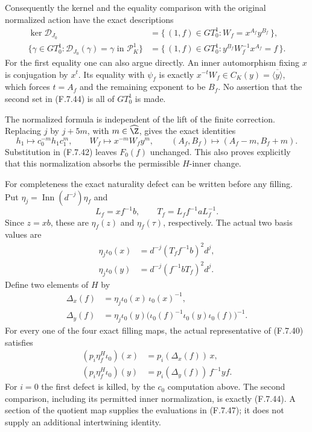 Consequently the kernel and the equality comparison
with the original normalized action have the exact
descriptions
\[
 \begin{split}
 \ker\mathcal D_{J_0}
   &=\{\,(1,f)\in GT_0^1:
                     W_f=x^{A_f}y^{B_f}\,\},\\
 \{\gamma\in GT_0^1:\mathcal D_{J_0}(\gamma)=\gamma
                                      \text{ in }\mathcal P_K^1\}
   &=\{\,(1,f)\in GT_0^1:
                     y^{B_f}W_f^{-1}x^{A_f}=f\,\}.
 \end{split}                                                   \tag{F.7.44}
\]
For the first equality one can also argue directly.
An inner automorphism fixing $x$ is conjugation
by $x^t$.  Its equality with $\psi_f$ is exactly
$x^{-t}W_f\in C_K(y)=\overline{\langle y\rangle}$,
which forces $t=A_f$ and the remaining exponent
to be $B_f$.
No assertion that the second set in (F.7.44)
is all of $GT_0^1$ is made.

The normalized formula is independent of the lift
of the finite correction.  Replacing $j$ by
$j+5m$, with $m\in\widehat\Z$, gives the exact
identities
\[
 h_1\longmapsto c_0^{-m}h_1c_1^m,\qquad
 W_f\longmapsto x^{-m}W_fy^m,\qquad
 (A_f,B_f)\longmapsto(A_f-m,B_f+m).
                                                               \tag{F.7.45}
\]
Substitution in (F.7.42) leaves $F_0(f)$ unchanged.
This also proves explicitly that this normalization
absorbs the permissible $H$-inner change.

For completeness the exact naturality defect can
be written before any filling.  Put
$\eta_j=\operatorname{Inn}(d^{-j})\eta_f$ and
\[
 L_f=x f^{-1}b,\qquad
 T_f=L_f f^{-1}a L_f^{-1}.
\]
Since $z=xb$, these are $\eta_f(z)$ and
$\eta_f(\tau)$, respectively.  The actual two
basis values are
\[
 \begin{split}
 \eta_j\iota_0(x)
     &=d^{-j}(T_f f^{-1}b)^2d^j,\\
 \eta_j\iota_0(y)
     &=d^{-j}(f^{-1}bT_f)^2d^j .
 \end{split}                                                   \tag{F.7.46}
\]
Define two elements of $H$ by
\[
 \begin{split}
 \Delta_x(f)&=\eta_j\iota_0(x)\,\iota_0(x)^{-1},\\
 \Delta_y(f)&=\eta_j\iota_0(y)
              \bigl(\iota_0(f)^{-1}
                       \iota_0(y)\iota_0(f)\bigr)^{-1}.
 \end{split}
\]
For every one of the four exact filling maps, the
actual representative of (F.7.40) satisfies
\[
 \begin{split}
 (p_i\eta_f^H\iota_0)(x)&=p_i(\Delta_x(f))\,x,\\
 (p_i\eta_f^H\iota_0)(y)&=
                   p_i(\Delta_y(f))\,f^{-1}yf .
 \end{split}                                                   \tag{F.7.47}
\]
For $i=0$ the first defect is killed, by the
$c_0$ computation above.  The second comparison,
including its permitted inner normalization, is
exactly (F.7.44).  A section of the quotient map
supplies the evaluations in (F.7.47); it does not
supply an additional intertwining identity.

